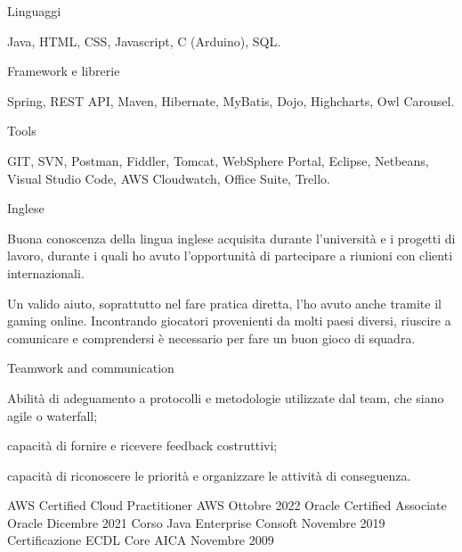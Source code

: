 \documentclass[]{style}
\begin{document}
\begin{cventries}
	\cvskillentry
	{Linguaggi}
	{\begin{cventryparagraph}
		\item {Java, HTML, CSS, Javascript, C (Arduino), SQL.}
	\end{cventryparagraph}}
	
	\cvskillentry
	{Framework e librerie}
	{\begin{cventryparagraph}
		\item {Spring, REST API, Maven, Hibernate, MyBatis, Dojo, Highcharts, Owl Carousel.}
	\end{cventryparagraph}}
	
	\cvskillentry
	{Tools}
	{\begin{cventryparagraph}
		\item {GIT, SVN, Postman, Fiddler, Tomcat, WebSphere Portal, Eclipse, Netbeans, Visual Studio Code, AWS Cloudwatch, Office Suite, Trello.}
	\end{cventryparagraph}}
	
	\cvskillentry
	{Inglese}
	{\begin{cventryparagraph}
		\item {Buona conoscenza della lingua inglese acquisita durante l'università e i progetti di lavoro, durante i quali ho avuto l'opportunità di partecipare a riunioni con clienti internazionali.}
		\item {Un valido aiuto, soprattutto nel fare pratica diretta, l'ho avuto anche tramite il gaming online. Incontrando giocatori provenienti da molti paesi diversi, riuscire a comunicare e comprendersi è necessario per fare un buon gioco di squadra.}
	\end{cventryparagraph}}
	
	\cvskillentry
	{Teamwork and communication}
	{\begin{cventryparagraph}
		\item {Abilità di adeguamento a protocolli e metodologie utilizzate dal team, che siano agile o waterfall;}
		\item {capacità di fornire e ricevere feedback costruttivi;}
		\item {capacità di riconoscere le priorità e organizzare le attività di conseguenza.}
	\end{cventryparagraph}}
\end{cventries}

\begin{cvhonors}
	\cvhonor
	{AWS Certified Cloud Practitioner}
	{}
	{AWS}
	{Ottobre 2022}
	\cvhonor
	{Oracle Certified Associate}
	{}
	{Oracle}
	{Dicembre 2021}
	\cvhonor
	{Corso Java Enterprise}
	{}
	{Consoft}
	{Novembre 2019}
	\cvhonor
	{Certificazione ECDL Core}
	{}
	{AICA}
	{Novembre 2009}
\end{cvhonors}
\end{document}
